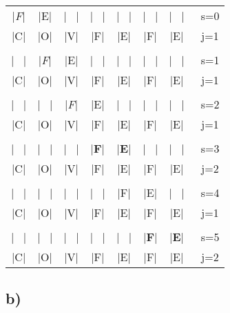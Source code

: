 \documentclass{article}
\begin{document}
\begin{center}
    \begin{tabular}{c c c c c c c c}
        |\textit{F}|&|E|&| \ |&| \ |&| \ |&| \ |&| \ | & \ s=0\\
        |C|&|O|&|V|&|F|&|E|&|F|&|E| & \ j=1\\
        \\
        | \ |&|\textit{F}|&|E|&| \ |&| \ |&| \ |&| \ | & \ s=1\\
        |C|&|O|&|V|&|F|&|E|&|F|&|E| & \ j=1\\
        \\
        | \ |&| \ |&|\textit{F}|&|E|&| \ |&| \ |&| \ | & \ s=2\\
        |C|&|O|&|V|&|F|&|E|&|F|&|E| & \ j=1\\
        \\
        | \ |&| \ |&| \ |&|\textbf{F}|&|\textbf{E}|&| \ |&| \ | & \ s=3\\
        |C|&|O|&|V|&|F|&|E|&|F|&|E| & \ j=2\\
        \\
        | \ |&| \ |&| \ |&| \ |&|F|&|E|&| \ | & \ s=4\\
        |C|&|O|&|V|&|F|&|E|&|F|&|E| & \ j=1\\
        \\
        | \ |&| \ |&| \ |&| \ |&| \ |&|\textbf{F}|&|\textbf{E}| & \ s=5\\
        |C|&|O|&|V|&|F|&|E|&|F|&|E| & \ j=2\\
    \end{tabular}
\end{center}

\subsection*{b)}
\end{document}
